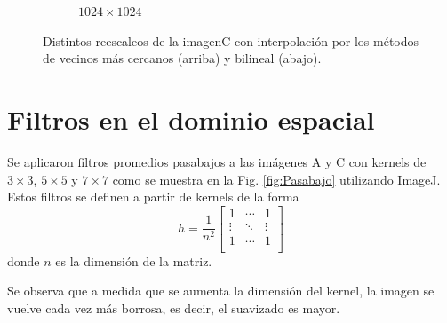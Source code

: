 \documentclass[letterpaper,12pt]{article}
\theoremstyle{plain}
\begin{document}
\begin{figure}[h]
\begin{subfigure}[h]{0.24\linewidth}
            \caption{$1024\times1024$} 
         \end{subfigure}
    \caption{Distintos reescaleos de la imagenC con interpolación por los métodos de vecinos más cercanos (arriba) y bilineal (abajo).}
    \label{fig:Interpolate}
\end{figure}

\section{Filtros en el dominio espacial\label{sec:ej4}}

\vspace{0.3cm}

Se aplicaron filtros promedios pasabajos a las imágenes A y C con kernels de $3\times3$, $5\times5$ y $7\times7$ como se muestra en la Fig. \ref{fig:Pasabajo} utilizando ImageJ. Estos filtros se definen a partir de kernels de la forma 
\begin{equation}
    h = \frac{1}{n^2} 
    \begin{bmatrix}
    1 & \cdots & 1 \\
    \vdots & \ddots & \vdots \\
    1 & \cdots & 1 \\
    \end{bmatrix}
\end{equation}
donde $n$ es la dimensión de la matriz. 

Se observa que a medida que se aumenta la dimensión del kernel, la imagen se vuelve cada vez más borrosa, es decir, el suavizado es mayor.
\end{document}
